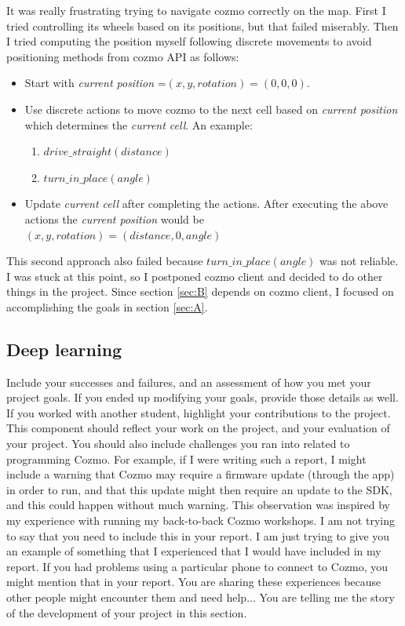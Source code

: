 \documentclass[12pt,a4paper]{article}
\begin{document}
It was really frustrating trying to navigate cozmo correctly on the map. First I tried controlling its wheels based on its positions, but that failed miserably. Then I tried computing the position myself following discrete movements to avoid positioning methods from cozmo API as follows:
\begin{itemize}
\item Start with \textit{current position} =$(x, y, rotation) = (0, 0, 0)$.
\item Use discrete actions to move cozmo to the next cell based on \textit{current position} which determines the \textit{current cell}. An example: 
\begin{enumerate}
\item $drive\_straight(distance)$
\item $turn\_in\_place(angle)$
\end{enumerate}

\item Update \textit{current cell} after completing the actions. After executing the above actions the \textit{current position} would be $(x, y, rotation) = (distance, 0, angle)$
\end{itemize}

This second approach also failed because  $turn\_in\_place(angle)$ was not reliable. I was stuck at this point, so I postponed cozmo client and decided to do other things in the project. Since section \ref{sec:B} depends on cozmo client, I focused on accomplishing the goals in section \ref{sec:A}. 

\subsection{Deep learning}

 Include your successes and failures, and an assessment of how you met your project goals.  If you ended up modifying your goals, provide those details as well.  If you worked with another student, highlight your contributions to the project.  This component should reflect your work on the project, and your evaluation of your project.  You should also include challenges you ran into related to programming Cozmo.  For example, if I were writing such a report, I might include a warning that Cozmo may require a firmware update (through the app) in order to run, and that this update might then require an update to the SDK, and this could happen without much warning.  This observation was inspired by my experience with running my back-to-back Cozmo workshops.  I am not trying to say that you need to include this in your report.  I am just trying to give you an example of something that I experienced that I would have included in my report.  If you had problems using a particular phone to connect to Cozmo, you might mention that in your report.  You are sharing these experiences because other people might encounter them and need help...  You are telling me the story of the development of your project in this section.
\end{document}
